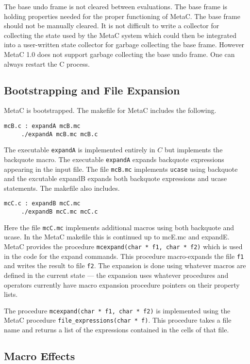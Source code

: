 \documentclass{article}
\begin{document}
The base undo frame is not cleared between evaluations. The base frame is holding properties needed for
the proper functioning of MetaC.
The base frame should not be manually cleared.  It is not difficult to write a collector for collecting the state used by the MetaC system which could then be integrated
into a user-written state collector for garbage collecting the base frame.  However MetaC 1.0 does not support garbage collecting the base undo frame.  One can always
restart the C process.

\subsection{Bootstrapping and File Expansion}
\label{sec:bootstrap}

MetaC is bootstrapped.  The makefile for MetaC includes the following.
\begin{verbatim}
mcB.c : expandA mcB.mc
	 ./expandA mcB.mc mcB.c
\end{verbatim}
The executable {\tt expandA} is implemented entirely in $C$ but implements the backquote macro.  The executable {\tt expandA}
expands backquote expressions appearing in the input file. The file {\tt mcB.mc} implements {\tt ucase} using backquote
and the excutable expandB expands both backquote expressions and ucase statements.
The makefile also includes.
\begin{verbatim}
mcC.c : expandB mcC.mc
	 ./expandB mcC.mc mcC.c
\end{verbatim}
Here the file {\tt mcC.mc} implements additional macros using both backquote and ucase.  In the MetaC makefile this is continued up to mcE.mc and expandE.
MetaC provides the procedure
{\tt mcexpand(char * f1, char * f2)} which is used in the code for the expand commands.  This procedure macro-expands the
file {\tt f1} and writes the result to file {\tt f2}.  The expansion is done using whatever macros are defined
in the current state --- the expansion uses whatever procedures and operators currently
have macro expansion procedure pointers on their property lists.

The procedure {\tt mcexpand(char * f1, char * f2)} is implemented using the MetaC procedure {\tt file\_expressions(char * f)}.
This procedure takes a file name and returns a list of the expressions contained in the cells of that file.

\subsection{Macro Effects}
\end{document}
